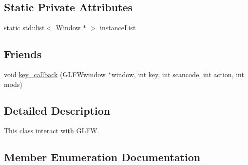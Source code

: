 \subsection*{Static Private Attributes}
\begin{DoxyCompactItemize}
\item 
static std\+::list$<$ \hyperlink{classWindow}{Window} $\ast$ $>$ \hyperlink{classWindow_a127957577b44e2088ae14c43be926c23}{instance\+List}
\end{DoxyCompactItemize}
\subsection*{Friends}
\begin{DoxyCompactItemize}
\item 
void \hyperlink{classWindow_a286930f4e8ede059b83ff6eafa2ff718}{key\+\_\+callback} (G\+L\+F\+Wwindow $\ast$window, int key, int scancode, int action, int mods)
\end{DoxyCompactItemize}


\subsection{Detailed Description}
This class interact with G\+L\+F\+W. 

\subsection{Member Enumeration Documentation}
\hypertarget{classWindow_a777c693a4c2b74e712839aa15189e07f}{}
